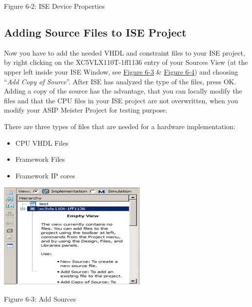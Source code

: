 \documentclass[
]{article}
\begin{document}
Figure 6‑2:\protect\hypertarget{Fig62}{}{} ISE Device Properties

\hypertarget{adding-source-files-to-ise-project}{%
\subsection{Adding Source Files to ISE
Project}\label{adding-source-files-to-ise-project}}

Now you have to add the needed VHDL and constraint files to your ISE
project, by right clicking on the XC5VLX110T-1ff1136 entry of your
Sources View (at the upper left inside your ISE Window, see
\protect\hyperlink{Fig63}{Figure 6-3} \&
\protect\hyperlink{Fig64}{Figure 6-4}) and choosing ``\emph{Add Copy of
Source}''. After ISE has analyzed the type of the files, press OK.
Adding a copy of the source has the advantage, that you can locally
modify the files and that the CPU files in your ISE project are not
overwritten, when you modify your ASIP Meister Project for testing
purpose.

There are three types of files that are needed for a hardware
implementation:

\begin{itemize}
\item
  CPU VHDL Files
\item
  Framework Files
\item
  Framework IP cores
\end{itemize}

\includegraphics[width=2.91042in,height=2.08958in]{6-3.png}

Figure 6‑3:\protect\hypertarget{Fig63}{}{} Add Sources
\end{document}
